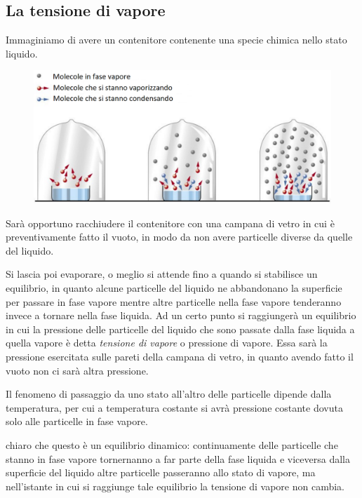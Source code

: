 \subsection{La tensione di vapore}
Immaginiamo di avere un contenitore contenente una specie chimica nello stato liquido.

\begin{figure}[htp]
    \centering
    \includegraphics[width=15cm]{immagini/campana_di_vetro}
\end{figure}

Sarà opportuno racchiudere il contenitore con una campana di vetro in cui è preventivamente fatto il vuoto, in modo da non avere particelle diverse da quelle del liquido.

Si lascia poi evaporare, o meglio si attende fino a quando si stabilisce un equilibrio, in quanto alcune particelle del liquido ne abbandonano la superficie per passare in fase vapore mentre altre particelle nella fase vapore tenderanno invece a tornare nella fase liquida. Ad un certo punto si raggiungerà un equilibrio in cui la pressione delle particelle del liquido che sono passate dalla fase liquida a quella vapore è detta \textit{tensione di vapore} o pressione di vapore. Essa sarà la pressione esercitata sulle pareti della campana di vetro, in quanto avendo fatto il vuoto non ci sarà altra pressione.

Il fenomeno di passaggio da uno stato all'altro delle particelle dipende dalla temperatura, per cui a temperatura costante si avrà pressione costante dovuta solo alle particelle in fase vapore.

\vspace{0.2cm}\E chiaro che questo è un equilibrio dinamico: continuamente delle particelle che stanno in fase vapore tornernanno a far parte della fase liquida e viceversa dalla superficie del liquido altre particelle passeranno allo stato di vapore, ma nell'istante in cui si raggiunge tale equilibrio la tensione di vapore non cambia.

